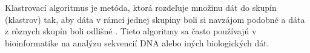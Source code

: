 Klastrovací algoritmus je metóda, ktorá rozdeľuje množinu dát do skupín (klastrov) tak, aby dáta v rámci jednej skupiny boli si navzájom podobné a dáta z rôznych skupín boli odlišné \cite{Qu2022Clover}. Tieto algoritmy sa často používajú v bioinformatike na analýzu sekvencií DNA alebo iných biologických dát.
